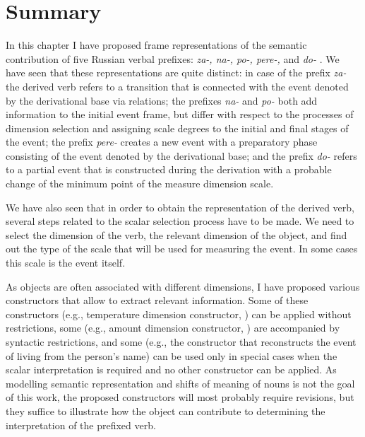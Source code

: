 \section{Summary}
In this chapter I have proposed frame representations of the semantic contribution of five Russian verbal prefixes: \textit{za-, na-, po-, pere-,} and \textit{do-}  . We have seen that these representations are quite distinct: in case of the prefix \textit{za-}   the derived verb refers to a transition that is connected with the event denoted by the derivational base via relations; the prefixes \textit{na-}   and \textit{po-}   both add information to the initial event frame, but differ with respect to the processes of dimension selection and assigning scale degrees to the initial and final stages of the event; the prefix \textit{pere-}   creates a new event with a preparatory phase consisting of the event denoted by the derivational base; and the prefix \textit{do-}   refers to a partial event that is constructed during the derivation with a probable change of the minimum point of the measure dimension scale.

We have also seen that in order to obtain the representation of the derived verb, several steps related to the scalar selection process have to be made. We need to select the dimension of the verb, the relevant dimension of the object, and find out the type of the scale that will be used for measuring the event. In some cases this scale is the event itself. 

As objects are often associated with different dimensions, I have proposed various constructors that allow to extract relevant information. Some of these constructors (e.g., temperature dimension constructor, ) can be applied without restrictions, some (e.g., amount dimension constructor, ) are accompanied by syntactic restrictions, and some (e.g., the constructor that reconstructs the event of living from the person's name) can be used only in special cases when the scalar interpretation is required and no other constructor can be applied. As modelling semantic representation and shifts of meaning of nouns is not the goal of this work, the proposed constructors will most probably require revisions, but they suffice to illustrate how the object can contribute to determining the interpretation of the prefixed verb.

